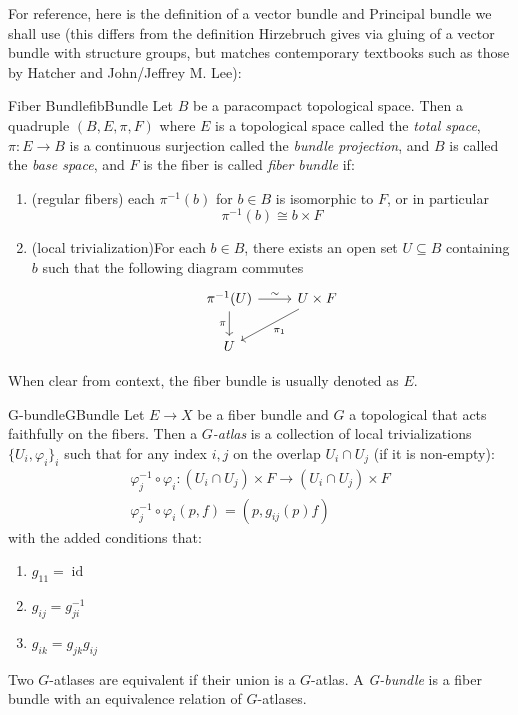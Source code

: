 \documentclass{book}
\newcommand{\id}{{\operatorname{id}}}
\newcommand{\sse}{\subseteq}
\let\temp\phi
\let\phi\varphi
\let\varphi\temp
\begin{document}
For reference, here is the definition of a vector bundle and Principal bundle we shall use (this differs from
the definition Hirzebruch gives via gluing of a vector bundle with structure groups, but matches contemporary
textbooks such as those by Hatcher and John/Jeffrey M. Lee):

\begin{defn}{Fiber Bundle}{fibBundle}
	Let $B$ be a paracompact topological space. Then a quadruple $(B, E, \pi, F)$ where $E$ is
	a topological space called the \emph{total space}, $\pi: E \to B$ is a continuous surjection called the
	\emph{bundle projection}, and $B$ is called the \emph{base space}, and $F$ is the fiber is called
	\emph{fiber bundle} if:
	\begin{enumerate}
		\item (regular fibers) each $\pi^{-1}(b)$ for $b \in B$ is isomorphic to $F$, or in particular
			\[
				\pi^{-1}(b) \cong b\times F
			\]
		\item (local trivialization)For each $ b\in B$, there exists an open set $U \sse B$ containing $b$ such that the following
			diagram commutes
			\[
				\begin{tikzcd}
				\pi^{-1}(U) \arrow[r, "\sim"] \arrow[d, "\pi"'] & U\times F \arrow[ld, "\pi_1"] \\
				U                                               &
				\end{tikzcd}
			\]
	\end{enumerate}
	When clear from context, the fiber bundle is usually denoted as $E$.
\end{defn}

\begin{defn}{G-bundle}{GBundle}
  Let $E \to X$ be a fiber bundle and $G$ a topological that acts faithfully on the fibers. Then
  a \emph{$G$-atlas} is a collection of local trivializations $\{U_i, \phi_i\}_i$ such that for any index
  $i,j$ on the overlap $U_i\cap U_j$ (if it is non-empty):
  \begin{gather*}
    \phi_j^{-1}\circ \phi_i: (U_i\cap U_j)\times F \to (U_i\cap U_j) \times F \\
    \phi_j^{-1}\circ\phi_i(p, f) = (p, g_{ij}(p)f)
  \end{gather*}
  with the added conditions that:
  \begin{enumerate}
    \item $g_{11} = \id$
    \item $g_{ij} = g_{ji}^{-1}$
    \item $g_{ik} = g_{jk}g_{ij}$
  \end{enumerate}
  Two $G$-atlases are equivalent if their union is a $G$-atlas. A \emph{G-bundle} is a fiber bundle with an
  equivalence relation of $G$-atlases.
\end{defn}
\end{document}
